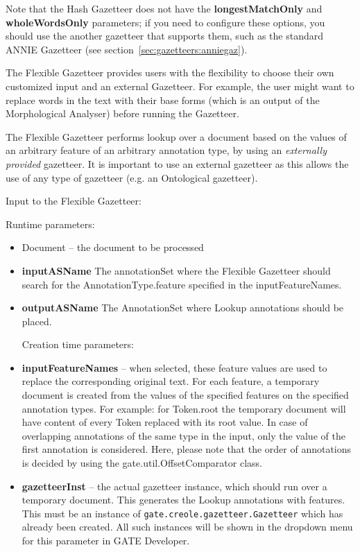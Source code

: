 Note that the Hash Gazetteer does not have the \textbf{longestMatchOnly} and
\textbf{wholeWordsOnly} parameters; if you need to configure these options, you
should use the another gazetteer that supports them, such as the standard ANNIE
Gazetteer (see section~\ref{sec:gazetteers:anniegaz}).

The Flexible Gazetteer provides users with the flexibility to choose their own
customized input and an external Gazetteer. For example, the user might want to replace
words in the text with their base forms (which is an output of the Morphological
Analyser) before running the Gazetteer.

The Flexible Gazetteer performs lookup over a document based on the
values of an arbitrary feature of an arbitrary annotation type, by using an
\textit{externally provided} gazetteer. It is important to use an external gazetteer as
this allows the use of any type of gazetteer (e.g. an Ontological gazetteer).

Input to the Flexible Gazetteer:

Runtime parameters:

\begin{itemize}

\item Document -- the document to be processed

\item \textbf{inputASName} The annotationSet where the Flexible
Gazetteer should search for the AnnotationType.feature specified in the
inputFeatureNames.

\item \textbf{outputASName} The AnnotationSet where Lookup
annotations should be placed.

Creation time parameters:

\item \textbf{inputFeatureNames} -- when selected, these feature values are used to
replace the corresponding original text.  For each feature, a temporary document is 
created from the values of the specified features on the specified annotation types. For
example: for Token.root the temporary document will have content of every Token 
replaced with its root value.  In case of overlapping annotations of the same type in 
the input, only the value of the first annotation is considered.  Here, please note that 
the order of annotations is decided by using the gate.util.OffsetComparator class.

\item \textbf{gazetteerInst} -- the actual gazetteer instance, which should run
over a temporary document. This generates the Lookup annotations with features.
This must be an instance of {\tt gate.creole.gazetteer.Gazetteer} which has
already been created. All such instances will be shown in the dropdown menu
for this parameter in GATE Developer.

\end{itemize}

